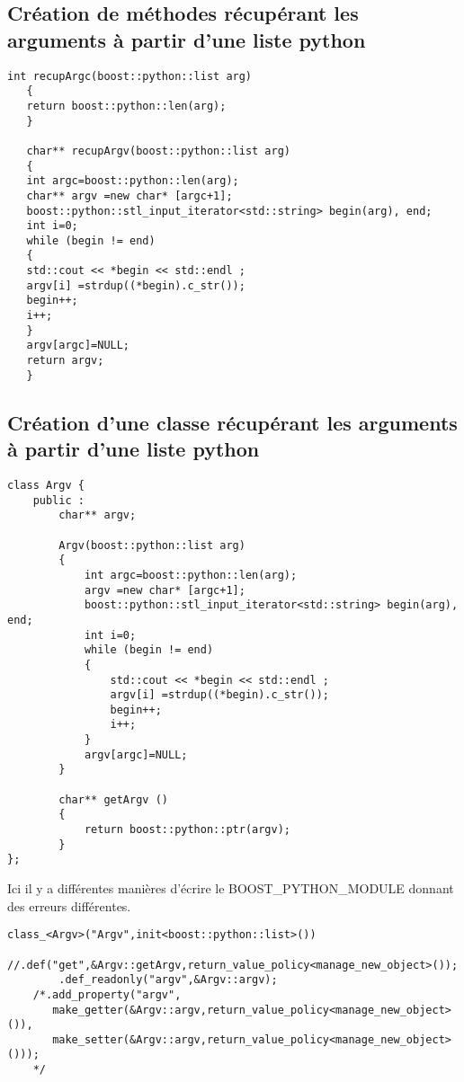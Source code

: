 \documentclass[12pt]{article}
\begin{document}
\subsection{Création de méthodes récupérant les arguments à partir d'une liste python}

\begin{lstlisting}
int recupArgc(boost::python::list arg)
   {
   return boost::python::len(arg);
   }

   char** recupArgv(boost::python::list arg)
   {
   int argc=boost::python::len(arg);
   char** argv =new char* [argc+1];
   boost::python::stl_input_iterator<std::string> begin(arg), end;
   int i=0;
   while (begin != end)
   {
   std::cout << *begin << std::endl ;
   argv[i] =strdup((*begin).c_str());
   begin++;
   i++;
   }
   argv[argc]=NULL;
   return argv;
   }
\end{lstlisting}

\subsection{Création d'une classe récupérant les arguments à partir d'une liste python}

\begin{lstlisting}
class Argv {
    public :
        char** argv;

        Argv(boost::python::list arg)
        {
            int argc=boost::python::len(arg);
            argv =new char* [argc+1];
            boost::python::stl_input_iterator<std::string> begin(arg), end;
            int i=0;
            while (begin != end)
            {
                std::cout << *begin << std::endl ;
                argv[i] =strdup((*begin).c_str());
                begin++;
                i++;
            }
            argv[argc]=NULL;
        }

        char** getArgv () 
        {
            return boost::python::ptr(argv);
        }
};
\end{lstlisting}

Ici il y a différentes manières d'écrire le BOOST\_PYTHON\_MODULE donnant des erreurs différentes.

\begin{lstlisting}
class_<Argv>("Argv",init<boost::python::list>())
     //.def("get",&Argv::getArgv,return_value_policy<manage_new_object>());
        .def_readonly("argv",&Argv::argv);
    /*.add_property("argv",
       make_getter(&Argv::argv,return_value_policy<manage_new_object>()),
       make_setter(&Argv::argv,return_value_policy<manage_new_object>()));
    */  
\end{lstlisting}
\end{document}
